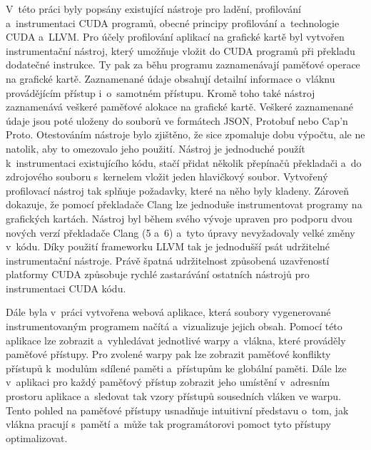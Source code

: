 V~této práci byly popsány existující nástroje pro ladění, profilování a~instrumentaci CUDA programů, obecné principy profilování a~technologie CUDA a~LLVM. Pro účely profilování aplikací na grafické kartě byl vytvořen instrumentační nástroj, který umožňuje vložit do CUDA programů při překladu dodatečné instrukce. Ty pak za běhu programu zaznamenávají paměťové operace na grafické kartě. Zaznamenané údaje obsahují detailní informace o~vláknu provádějícím přístup i~o~samotném přístupu. Kromě toho také nástroj zaznamenává veškeré paměťové alokace na grafické kartě. Veškeré zaznamenané údaje jsou poté uloženy do souborů ve formátech JSON, Protobuf nebo Cap'n Proto. Otestováním nástroje bylo zjištěno, že sice zpomaluje dobu výpočtu, ale ne natolik, aby to omezovalo jeho použití. Nástroj je jednoduché použít k~instrumentaci existujícího kódu, stačí přidat několik přepínačů překladači a~do zdrojového souboru s~kernelem vložit jeden hlavičkový soubor. Vytvořený profilovací nástroj tak splňuje požadavky, které na něho byly kladeny. Zároveň dokazuje, že pomocí překladače Clang lze jednoduše instrumentovat programy na grafických kartách. Nástroj byl během svého vývoje upraven pro podporu dvou nových verzí překladače Clang (5 a~6) a~tyto úpravy nevyžadovaly velké změny v~kódu. Díky použití frameworku LLVM tak je jednodušší psát udržitelné instrumentační nástroje. Právě špatná udržitelnost způsobená uzavřeností platformy CUDA způsobuje rychlé zastarávání ostatních nástrojů pro instrumentaci CUDA kódu.

Dále byla v~práci vytvořena webová aplikace, která soubory vygenerované instrumentovaným programem načítá a~vizualizuje jejich obsah. Pomocí této aplikace lze zobrazit a~vyhledávat jednotlivé warpy a~vlákna, které prováděly paměťové přístupy. Pro zvolené warpy pak lze zobrazit paměťové konflikty přístupů k~modulům sdílené paměti a~přístupům ke globální paměti. Dále lze v~aplikaci pro každý paměťový přístup zobrazit jeho umístění v~adresním prostoru aplikace a~sledovat tak vzory přístupů sousedních vláken ve warpu. Tento pohled na paměťové přístupy usnadňuje intuitivní představu o~tom, jak vlákna pracují s~pamětí a~může tak programátorovi pomoct tyto přístupy optimalizovat.

